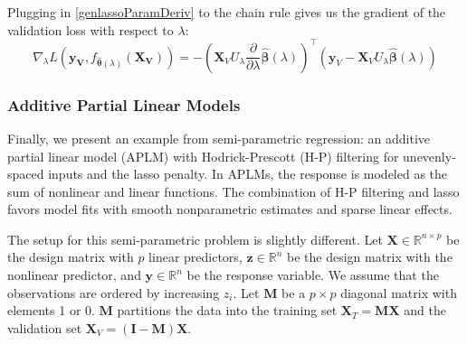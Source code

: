 \documentclass[10pt,letterpaper]{article}
\begin{document}
Plugging in \eqref{genlassoParamDeriv} to the chain rule gives us the gradient of the validation loss with respect to $\lambda$:
\begin{equation}
\nabla_{\lambda} L(\boldsymbol{y_V}, f_{\hat{\boldsymbol{\theta}}(\lambda)}(\boldsymbol{X_V})) = 
- \left (
\boldsymbol{X}_V U_\lambda
\frac{\partial}{\partial \lambda} \hat{\boldsymbol \beta}(\lambda)
\right )^\top
\left (
\boldsymbol{y}_V - \boldsymbol{X}_V U_\lambda \hat{\boldsymbol{\beta}} (\lambda)
\right )
\end{equation}


\subsubsection{Additive Partial Linear Models}

Finally, we present an example from semi-parametric regression: an additive partial linear model (APLM) with Hodrick-Prescott (H-P) filtering for unevenly-spaced inputs and the lasso penalty. In APLMs, the response is modeled as the sum of nonlinear and linear functions.  The combination of H-P filtering and lasso favors model fits with smooth nonparametric estimates and sparse linear effects.

The setup for this semi-parametric problem is slightly different. Let $\boldsymbol{X} \in \mathbb{R}^{n \times p}$ be the design matrix with $p$ linear predictors, $\boldsymbol{z} \in \mathbb{R}^n$ be the design matrix with the nonlinear predictor, and $\boldsymbol{y} \in \mathbb{R}^n$ be the response variable. We assume that the observations are ordered by increasing $z_i$. Let $\boldsymbol{M}$ be a $p \times p$ diagonal matrix with elements 1 or 0. $\boldsymbol{M}$ partitions the data into the training set $\boldsymbol{X}_T= \boldsymbol{M} \boldsymbol{X}$ and the validation set $\boldsymbol{X}_V= (\boldsymbol{I} - \boldsymbol{M}) \boldsymbol{X}$.
\end{document}

